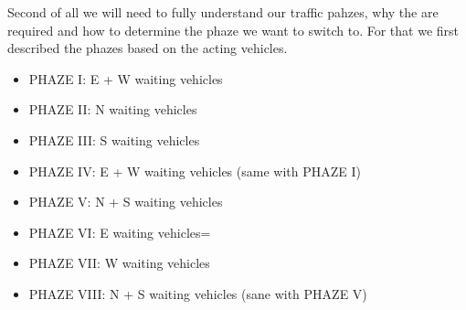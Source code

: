 \documentclass[17pt]{article}
\begin{document}
\indent \indent
Second of all we will need to fully understand our traffic pahzes, why the are required
and how to determine the phaze we want to switch to. For that we first described the 
phazes based on the acting vehicles.\\
\begin{itemize}
    \item PHAZE I: E + W waiting vehicles
    \item PHAZE II: N waiting vehicles
    \item PHAZE III: S waiting vehicles
    \item PHAZE IV: E + W waiting vehicles (same with PHAZE I)
    \item PHAZE V: N + S waiting vehicles
    \item PHAZE VI: E waiting vehicles=
    \item PHAZE VII: W waiting vehicles
    \item PHAZE VIII: N + S waiting vehicles (sane with PHAZE V)
\end{itemize}
\end{document}
